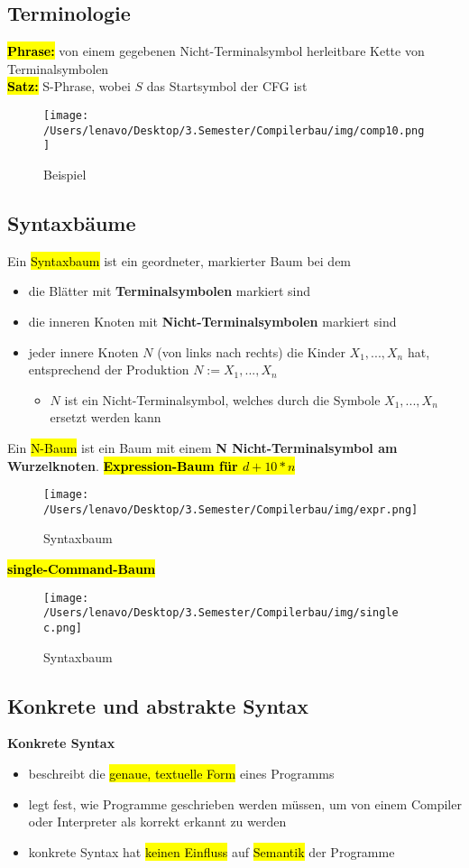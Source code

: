 \documentclass[a4paper, 10pt]{article}
\begin{document}
\subsection{Terminologie}
\textbf{\hl{Phrase:}} von einem gegebenen Nicht-Terminalsymbol herleitbare Kette von Terminalsymbolen\\[3mm]
\textbf{\hl{Satz:}} S-Phrase, wobei $S$ das Startsymbol der CFG ist
\begin{figure}[h]
    \centering
    \texttt{[image: /Users/lenavo/Desktop/3.Semester/Compilerbau/img/comp10.png]}
    \caption{Beispiel}
    \label{fig:enter-label}
\end{figure}

\subsection{Syntaxbäume}
Ein \hl{Syntaxbaum} ist ein geordneter, markierter Baum bei dem
\begin{itemize}
    \item die Blätter mit \textbf{Terminalsymbolen} markiert sind
    \item die inneren Knoten mit \textbf{Nicht-Terminalsymbolen} markiert sind
    \item jeder innere Knoten $N$ (von links nach rechts) die Kinder $X_1,...,X_n$ hat, entsprechend der Produktion $N := X_1,...,X_n$
    \begin{itemize}
        \item $N$ ist ein Nicht-Terminalsymbol, welches durch die Symbole $X_1,...,X_n$ ersetzt werden kann
    \end{itemize}
\end{itemize}
Ein \hl{N-Baum} ist ein Baum mit einem \textbf{N Nicht-Terminalsymbol am Wurzelknoten}.
\newpage
\noindent\textbf{\hl{Expression-Baum für $d + 10 * n$}}
\begin{figure}[h]
    \centering
    \texttt{[image: /Users/lenavo/Desktop/3.Semester/Compilerbau/img/expr.png]}
    \caption{Syntaxbaum}
    \label{fig:enter-label}
\end{figure}

\noindent\textbf{\hl{single-Command-Baum}}
\begin{figure}[h]
    \centering
    \texttt{[image: /Users/lenavo/Desktop/3.Semester/Compilerbau/img/single c.png]}
    \caption{Syntaxbaum}
    \label{fig:enter-label}
\end{figure}

\subsection{Konkrete und abstrakte Syntax}
\textbf{Konkrete Syntax}
\begin{itemize}
    \item beschreibt die \hl{genaue, textuelle Form} eines Programms
    \item legt fest, wie Programme geschrieben werden müssen, um von einem Compiler oder Interpreter als korrekt erkannt zu werden
    \item konkrete Syntax hat \hl{keinen Einfluss} auf \hl{Semantik} der Programme
\end{itemize}
\end{document}
